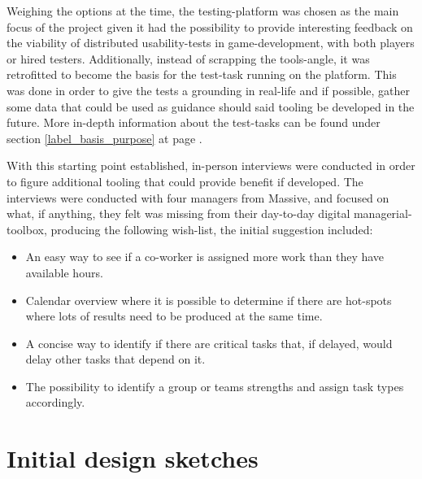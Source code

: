 {Weighing the options at the time, the testing-platform was chosen as the main
focus of the project given it had the possibility to provide interesting
feedback on the viability of distributed usability-tests in game-development,
with both players or hired testers. Additionally, instead of scrapping the
tools-angle, it was retrofitted to become the basis for the test-task running
on the platform. This was done in order to give the tests a grounding in
real-life and if possible, gather some data that could be used as guidance
should said tooling be developed in the future. More in-depth information about
the test-tasks can be found under section \ref{label_basis_purpose} at page
\pageref{label_basis_purpose}.

With this starting point established, in-person interviews were conducted
in order to figure additional tooling that could provide benefit if developed.
The interviews were conducted with four managers from Massive, and focused on
what, if anything, they felt was missing from their day-to-day digital
managerial-toolbox, producing the following wish-list, the initial
suggestion included:


  \newcommand{\ideaOne}{%
    An easy way to see if a co-worker is assigned more work than they have
    available hours.%
  }

  \newcommand{\ideaTwo}{%
    Calendar overview where it is possible to determine if there are
    hot-spots where lots of results need to be produced at the same
    time.%
  }

  \newcommand{\ideaThree}{%
    A concise way to identify if there are critical tasks that, if
    delayed, would delay other tasks that depend on it.%
  }

  \newcommand{\ideaFour}{%
    The possibility to identify a group or teams strengths and assign
    task types accordingly.%
  }

  \begin{itemize}
    \item{\ideaOne\label{label_ideas}}
    \item{\ideaTwo}
    \item{\ideaThree}
    \item{\ideaFour}
  \end{itemize}


\section{Initial design sketches}

%
%
%

}
